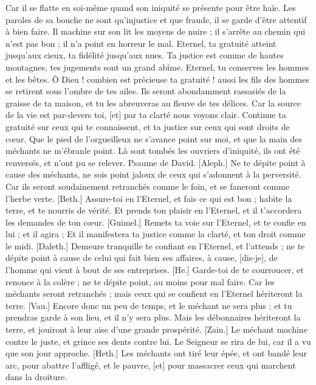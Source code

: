 \begin{multicols}{2}
Car il se flatte en soi-même quand son iniquité se présente pour être haïe.
Les paroles de sa bouche ne sont qu'injustice et que fraude, il se garde d'être attentif à bien faire.
Il machine sur son lit les moyens de nuire ; il s'arrête au chemin qui n'est pas bon ; il n'a point en horreur le mal.
Eternel, ta gratuité atteint jusqu'aux cieux, ta fidélité jusqu'aux nues.
Ta justice est comme de hautes montagnes, tes jugements sont un grand abîme. Eternel, tu conserves les hommes et les bêtes.
Ô Dieu ! combien est précieuse ta gratuité ! aussi les fils des hommes se retirent sous l'ombre de tes ailes.
Ils seront abondamment rassasiés de la graisse de ta maison, et tu les abreuveras au fleuve de tes délices.
Car la source de la vie est par-devers toi, [et] par ta clarté nous voyons clair.
Continue ta gratuité sur ceux qui te connaissent, et ta justice sur ceux qui sont droits de cœur.
Que le pied de l'orgueilleux ne s'avance point sur moi, et que la main des méchants ne m'ébranle point.
Là sont tombés les ouvriers d'iniquité, ils ont été renversés, et n'ont pu se relever.
\VerseOne{}Psaume de David. [Aleph.] Ne te dépite point à cause des méchants, ne sois point jaloux de ceux qui s'adonnent à la perversité.
Car ils seront soudainement retranchés comme le foin, et se faneront comme l'herbe verte.
[Beth.] Assure-toi en l'Eternel, et fais ce qui est bon ; habite la terre, et te nourris de vérité.
Et prends ton plaisir en l'Eternel, et il t'accordera les demandes de ton cœur.
[Guimel.] Remets ta voie sur l'Eternel, et te confie en lui ; et il agira ;
Et il manifestera ta justice comme la clarté, et ton droit comme le midi.
[Daleth.] Demeure tranquille te confiant en l'Eternel, et l'attends ; ne te dépite point à cause de celui qui fait bien ses affaires, à cause, [dis-je], de l'homme qui vient à bout de ses entreprises.
[He.] Garde-toi de te courroucer, et renonce à la colère ; ne te dépite point, au moins pour mal faire.
Car les méchants seront retranchés ; mais ceux qui se confient en l'Eternel hériteront la terre.
[Vau.] Encore donc un peu de temps, et le méchant ne sera plus ; et tu prendras garde à son lieu, et il n'y sera plus.
Mais les débonnaires hériteront la terre, et jouiront à leur aise d'une grande prospérité.
[Zain.] Le méchant machine contre le juste, et grince ses dents contre lui.
Le Seigneur se rira de lui, car il a vu que son jour approche.
[Heth.] Les méchants ont tiré leur épée, et ont bandé leur arc, pour abattre l'affligé, et le pauvre, [et] pour massacrer ceux qui marchent dans la droiture.

\end{multicols}
